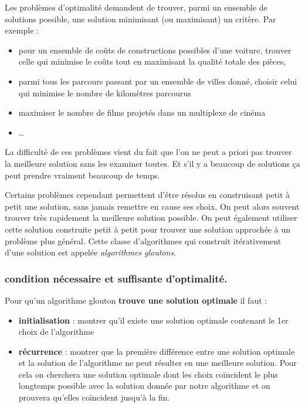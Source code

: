 \documentclass[
]{article}
\providecommand{\tightlist}{%
  \setlength{\itemsep}{0pt}\setlength{\parskip}{0pt}}
\begin{document}
Les problèmes d'optimalité demandent de trouver, parmi un ensemble de
solutions possible, une solution minimisant (ou maximisant) un critère.
Par exemple :

\begin{itemize}
\tightlist
\item
  pour un ensemble de coûts de constructions possibles d'une voiture,
  trouver celle qui minimise le coûts tout en maximisant la qualité
  totale des pièces,
\item
  parmi tous les parcours passant par un ensemble de villes donné,
  choisir celui qui minimise le nombre de kilomètres parcourus
\item
  maximiser le nombre de films projetés dans un multiplexe de cinéma
\item
  \ldots{}
\end{itemize}

La difficulté de ces problèmes vient du fait que l'on ne peut a priori
pas trouver la meilleure solution sans les examiner toutes. Et s'il y a
beaucoup de solutions ça peut prendre vraiment beaucoup de temps.

Certains problèmes cependant permettent d'être résolus en construisant
petit à petit une solution, sans jamais remettre en cause ses choix. On
peut alors souvent trouver très rapidement la meilleure solution
possible. On peut également utiliser cette solution construite petit à
petit pour trouver une solution approchée à un problème plus général.
Cette classe d'algorithmes qui construit itérativement d'une solution
est appelée \emph{algorithmes gloutons}.

\hypertarget{condition-nuxe9cessaire-et-suffisante-doptimalituxe9.}{%
\subsubsection{condition nécessaire et suffisante
d'optimalité.}\label{condition-nuxe9cessaire-et-suffisante-doptimalituxe9.}}

Pour qu'un algorithme glouton \textbf{trouve une solution optimale} il
faut :

\begin{itemize}
\tightlist
\item
  \textbf{initialisation} : montrer qu'il existe une solution optimale
  contenant le 1er choix de l'algorithme
\item
  \textbf{récurrence} : montrer que la première différence entre une
  solution optimale et la solution de l'algorithme ne peut résulter en
  une meilleure solution. Pour cela on cherchera une solution optimale
  dont les choix coïncident le plus longtemps possible avec la solution
  donnée par notre algorithme et on prouvera qu'elles coïncident jusqu'à
  la fin.
\end{itemize}
\end{document}
